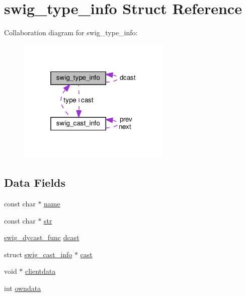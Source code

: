 \hypertarget{structswig__type__info}{}\section{swig\+\_\+type\+\_\+info Struct Reference}
\label{structswig__type__info}


Collaboration diagram for swig\+\_\+type\+\_\+info\+:\nopagebreak
\begin{figure}[H]
\begin{center}
\leavevmode
\includegraphics[width=208pt]{structswig__type__info__coll__graph}
\end{center}
\end{figure}
\subsection*{Data Fields}
\begin{DoxyCompactItemize}
\item 
const char $\ast$ \hyperlink{structswig__type__info_a90a9c6a25aa3e923978005ecbe23ad60}{name}
\item 
const char $\ast$ \hyperlink{structswig__type__info_abbe7cc58a083feb4329b748643324064}{str}
\item 
\hyperlink{pdnsim__wrap_8cpp_aee981c41d733723d60337a77630106af}{swig\+\_\+dycast\+\_\+func} \hyperlink{structswig__type__info_a07df4bedf85be77b23756b531b60e0dd}{dcast}
\item 
struct \hyperlink{structswig__cast__info}{swig\+\_\+cast\+\_\+info} $\ast$ \hyperlink{structswig__type__info_a3ee3f7ef20e965b6c798d79723a96f9b}{cast}
\item 
void $\ast$ \hyperlink{structswig__type__info_a19bdd65dceb89cd54befd3ded06558b7}{clientdata}
\item 
int \hyperlink{structswig__type__info_a93c25d5903cbfcb82208eea7227c32bd}{owndata}
\end{DoxyCompactItemize}


